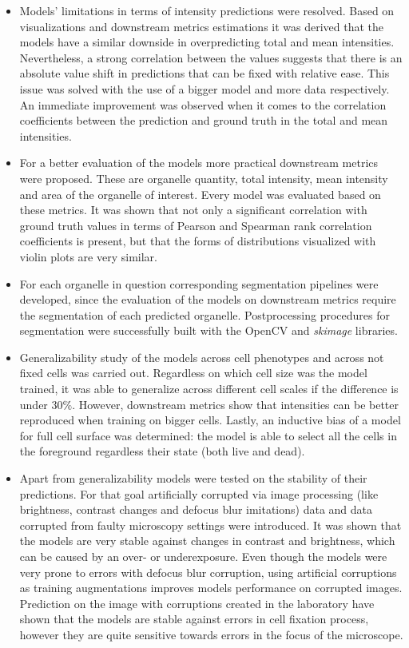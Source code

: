 \begin{itemize}
    \item Models' limitations in terms of intensity predictions were resolved. Based on visualizations and downstream metrics estimations it was derived that the models have a similar downside in overpredicting total and mean intensities. Nevertheless, a strong correlation between the values suggests that there is an absolute value shift in predictions that can be fixed with relative ease. This issue was solved with the use of a bigger model and more data respectively. An immediate improvement was observed when it comes to the correlation coefficients between the prediction and ground truth in the total and mean intensities.
    
    \item For a better evaluation of the models more practical downstream metrics were proposed. These are organelle quantity, total intensity, mean intensity and area of the organelle of interest. Every model was evaluated based on these metrics. It was shown that not only a significant correlation with ground truth values in terms of Pearson and Spearman rank correlation coefficients is present, but that the forms of distributions visualized with violin plots are very similar.
    
    \item For each organelle in question corresponding segmentation pipelines were developed, since the evaluation of the models on downstream metrics require the segmentation of each predicted organelle. Postprocessing procedures for segmentation were successfully built with the OpenCV and \textit{skimage} libraries. 
    
    \item Generalizability study of the models across cell phenotypes and across not fixed cells was carried out. Regardless on which cell size was the model trained, it was able to generalize across different cell scales if the difference is under $30\%$. However, downstream metrics show that intensities can be better reproduced when training on bigger cells. Lastly, an inductive bias of a model for full cell surface was determined: the model is able to select all the cells in the foreground regardless their state (both live and dead).

    \item Apart from generalizability models were tested on the stability of their predictions. For that goal artificially corrupted via image processing (like brightness, contrast changes and defocus blur imitations) data and data corrupted from faulty microscopy settings were introduced. It was shown that the models are very stable against changes in contrast and brightness, which can be caused by an over- or underexposure. Even though the models were very prone to errors with defocus blur corruption, using artificial corruptions as training augmentations improves models performance on corrupted images. Prediction on the image with corruptions created in the laboratory have shown that the models are stable against errors in cell fixation process, however they are quite sensitive towards errors in the focus of the microscope.
    

\end{itemize}
